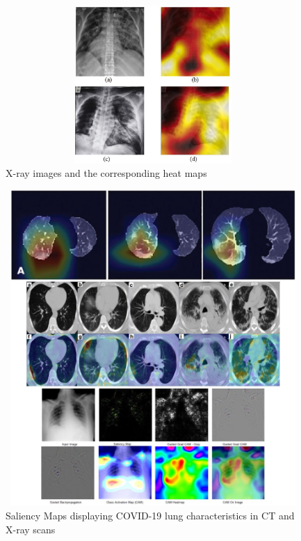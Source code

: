     \begin{figure}[H]
    \centering
    \includegraphics[width=15cm, height=6cm]{Images/Saliency4.JPG}
    \caption[X-ray Heat Map]{X-ray images and the corresponding heat maps \cite{OTY+2020}}
    \label{fig:X-ray images and their corresponding heat maps}
    \end{figure}




\begin{figure}[H]
    \centering
    \includegraphics[width=15.5cm, height=12cm]{Images/Saliency Maps.png}
    \caption[Attention Heat Map]{Saliency Maps displaying COVID-19 lung characteristics in CT and X-ray scans \cite{LLL+2020} \cite{GHT2020} \cite{HSX+2020}}
    \label{fig:Saliency Maps displaying COVID-19 lung characteristics in CT and X-ray scans}
    \end{figure}
    

